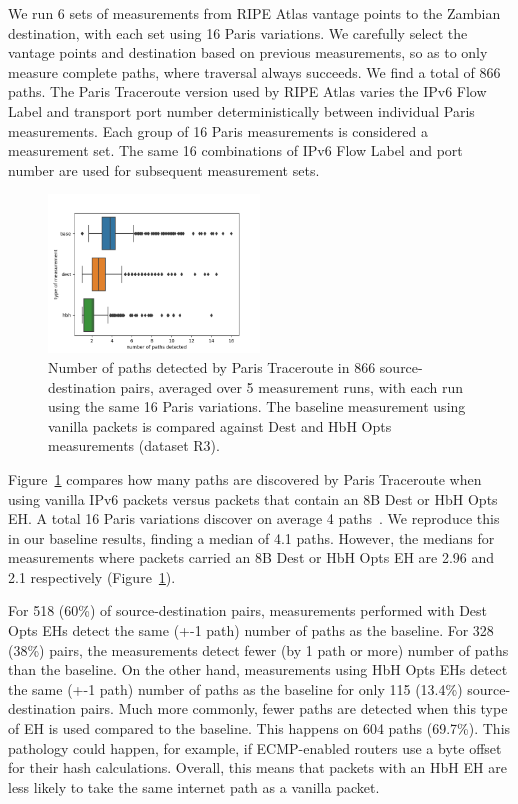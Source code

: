 \documentclass[conference]{IEEEtran}
\begin{document}
We run 6 sets of measurements from RIPE Atlas vantage points to the Zambian destination, with each set using 16 Paris variations. We carefully select the vantage points and destination based on previous measurements, so as to only measure complete paths, where traversal always succeeds. We find a total of 866 paths. The Paris Traceroute version used by RIPE Atlas varies the IPv6 Flow Label and transport port number deterministically between individual Paris measurements. Each group of 16 Paris measurements is considered a measurement set. The same 16 combinations of IPv6 Flow Label and port number are used for subsequent measurement sets.

\begin{figure}
\centering
  \includegraphics[width=0.5\textwidth]{boxplot-paths-detected.png}
  \caption{Number of paths detected by Paris Traceroute in 866 source-destination pairs, averaged over 5 measurement runs, with each run using the same 16 Paris variations. The baseline measurement using vanilla packets is compared against Dest and HbH Opts measurements (dataset R3).}
  \label{fig:paths-detected}
\end{figure}

Figure~\ref{fig:paths-detected} compares how many paths are discovered by Paris Traceroute when using vanilla IPv6 packets versus packets that contain an 8B Dest or HbH Opts EH.
A total 16 Paris variations discover on average 4 paths~\cite{augustin2006avoiding}. We reproduce this in our baseline results, finding a median of 4.1 paths. However, the medians for measurements where packets carried an 8B Dest or HbH Opts EH are 2.96 and 2.1 respectively (Figure~\ref{fig:paths-detected}).

For 518 (60\%) of source-destination pairs, measurements performed with Dest Opts EHs detect the same (+-1 path) number of paths as the baseline. For 328 (38\%) pairs, the measurements detect fewer (by 1 path or more) number of paths than the baseline. On the other hand, measurements using HbH Opts EHs detect the same (+-1 path) number of paths as the baseline for only 115 (13.4\%) source-destination pairs. Much more commonly, fewer paths are detected when this type of EH is used compared to the baseline. This happens on 604 paths (69.7\%). This pathology could happen, for example, if ECMP-enabled routers use a byte offset for their hash calculations. Overall, this means that packets with an HbH EH are less likely to take the same internet path as a vanilla packet.
\end{document}
